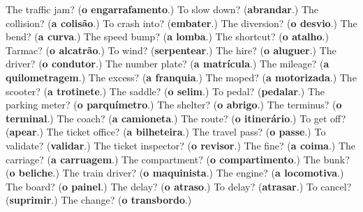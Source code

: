 \begin{tcolorbox}[breakable,colback=teal!4,colframe=teal!35!black,title={Before you move on}]
The traffic jam? (\textbf{o engarrafamento}.) To slow down? (\textbf{abrandar}.) The collision? (\textbf{a colisão}.) To crash into? (\textbf{embater}.) The diversion? (\textbf{o desvio}.) The bend? (\textbf{a curva}.) The speed bump? (\textbf{a lomba}.) The shortcut? (\textbf{o atalho}.) Tarmac? (\textbf{o alcatrão}.) To wind? (\textbf{serpentear}.) The hire? (\textbf{o aluguer}.) The driver? (\textbf{o condutor}.) The number plate? (\textbf{a matrícula}.) The mileage? (\textbf{a quilometragem}.) The excess? (\textbf{a franquia}.) The moped? (\textbf{a motorizada}.) The scooter? (\textbf{a trotinete}.) The saddle? (\textbf{o selim}.) To pedal? (\textbf{pedalar}.) The parking meter? (\textbf{o parquímetro}.) The shelter? (\textbf{o abrigo}.) The terminus? (\textbf{o terminal}.) The coach? (\textbf{a camioneta}.) The route? (\textbf{o itinerário}.) To get off? (\textbf{apear}.) The ticket office? (\textbf{a bilheteira}.) The travel pass? (\textbf{o passe}.) To validate? (\textbf{validar}.) The ticket inspector? (\textbf{o revisor}.) The fine? (\textbf{a coima}.) The carriage? (\textbf{a carruagem}.) The compartment? (\textbf{o compartimento}.) The bunk? (\textbf{o beliche}.) The train driver? (\textbf{o maquinista}.) The engine? (\textbf{a locomotiva}.) The board? (\textbf{o painel}.) The delay? (\textbf{o atraso}.) To delay? (\textbf{atrasar}.) To cancel? (\textbf{suprimir}.) The change? (\textbf{o transbordo}.)
\end{tcolorbox}

